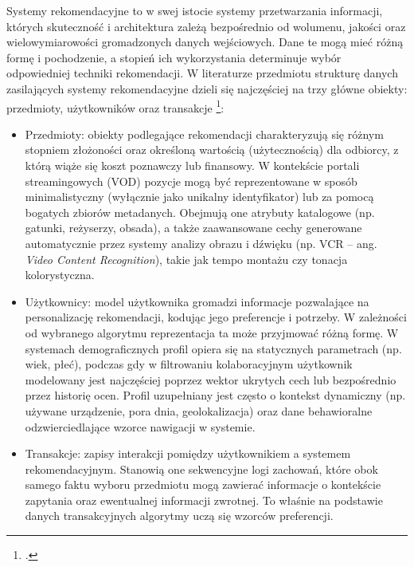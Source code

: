 Systemy rekomendacyjne to w swej istocie systemy przetwarzania informacji, których skuteczność i architektura zależą bezpośrednio od wolumenu, jakości oraz wielowymiarowości gromadzonych danych wejściowych. Dane te mogą mieć różną formę i pochodzenie, a stopień ich wykorzystania determinuje wybór odpowiedniej techniki rekomendacji. W literaturze przedmiotu strukturę danych zasilających systemy rekomendacyjne dzieli się najczęściej na trzy główne obiekty: przedmioty, użytkowników oraz transakcje \footcite{ricciRecommenderSystemsHandbook2010}:

\begin{itemize}
    \item Przedmioty: obiekty podlegające rekomendacji charakteryzują się różnym stopniem złożoności oraz określoną wartością (użytecznością) dla odbiorcy, z którą wiąże się koszt poznawczy lub finansowy. W kontekście portali streamingowych (VOD) pozycje mogą być reprezentowane w sposób minimalistyczny (wyłącznie jako unikalny identyfikator) lub za pomocą bogatych zbiorów metadanych. Obejmują one atrybuty katalogowe (np. gatunki, reżyserzy, obsada), a także zaawansowane cechy generowane automatycznie przez systemy analizy obrazu i dźwięku (np. VCR -- ang. \foreignlanguage{english}{\textit{Video Content Recognition}}), takie jak tempo montażu czy tonacja kolorystyczna.

    \item Użytkownicy: model użytkownika gromadzi informacje pozwalające na personalizację rekomendacji, kodując jego preferencje i potrzeby. W zależności od wybranego algorytmu reprezentacja ta może przyjmować różną formę. W systemach demograficznych profil opiera się na statycznych parametrach (np. wiek, płeć), podczas gdy w filtrowaniu kolaboracyjnym użytkownik modelowany jest najczęściej poprzez wektor ukrytych cech lub bezpośrednio przez historię ocen. Profil uzupełniany jest często o kontekst dynamiczny (np. używane urządzenie, pora dnia, geolokalizacja) oraz dane behawioralne odzwierciedlające wzorce nawigacji w systemie.

    \item Transakcje: zapisy interakcji pomiędzy użytkownikiem a systemem rekomendacyjnym. Stanowią one sekwencyjne logi zachowań, które obok samego faktu wyboru przedmiotu mogą zawierać informacje o kontekście zapytania oraz ewentualnej informacji zwrotnej. To właśnie na podstawie danych transakcyjnych algorytmy uczą się wzorców preferencji.
\end{itemize}

